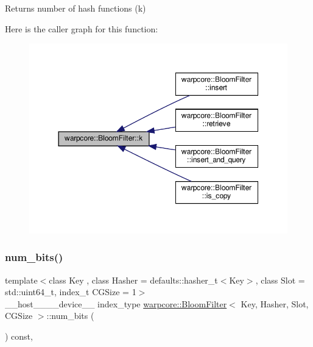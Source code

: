 \begin{DoxyReturn}{Returns}
number of hash functions (k) 
\end{DoxyReturn}
Here is the caller graph for this function\+:
\nopagebreak
\begin{figure}[H]
\begin{center}
\leavevmode
\includegraphics[width=350pt]{classwarpcore_1_1BloomFilter_a33c972e8a462625d6253b58bbd5585f3_icgraph}
\end{center}
\end{figure}
\mbox{\label{classwarpcore_1_1BloomFilter_a54a25926cf770e834c47ad5164e91443}} 
\subsubsection{\texorpdfstring{num\+\_\+bits()}{num\_bits()}}
{\footnotesize\ttfamily template$<$class Key , class Hasher  = defaults\+::hasher\+\_\+t$<$\+Key$>$, class Slot  = std\+::uint64\+\_\+t, index\+\_\+t C\+G\+Size = 1$>$ \\
\+\_\+\+\_\+host\+\_\+\+\_\+\+\_\+\+\_\+device\+\_\+\+\_\+ index\+\_\+type \hyperlink{classwarpcore_1_1BloomFilter}{warpcore\+::\+Bloom\+Filter}$<$ Key, Hasher, Slot, C\+G\+Size $>$\+::num\+\_\+bits (\begin{DoxyParamCaption}{ }\end{DoxyParamCaption}) const\hspace{0.3cm}{\ttfamily [inline]}, {\ttfamily [noexcept]}}



